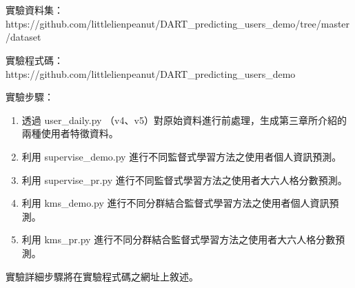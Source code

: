 \begin{appendA}
\begin{alwayssingle}
 \\
 \\

實驗資料集：https://github.com/littlelienpeanut/DART\_predicting\_users\_demo/tree/master/dataset \par

實驗程式碼：https://github.com/littlelienpeanut/DART\_predicting\_users\_demo\par

實驗步驟：\par
\begin{center}
\begin{enumerate}

\item 透過 user\_daily.py （v4、v5）對原始資料進行前處理，生成第三章所介紹的兩種使用者特徵資料。
\item 利用 supervise\_demo.py 進行不同監督式學習方法之使用者個人資訊預測。
\item 利用 supervise\_pr.py 進行不同監督式學習方法之使用者大六人格分數預測。
\item 利用 kms\_demo.py 進行不同分群結合監督式學習方法之使用者個人資訊預測。
\item 利用 kms\_pr.py 進行不同分群結合監督式學習方法之使用者大六人格分數預測。
\end{enumerate}
\end{center} \par
實驗詳細步驟將在實驗程式碼之網址上敘述。
\end{alwayssingle}
\end{appendA}